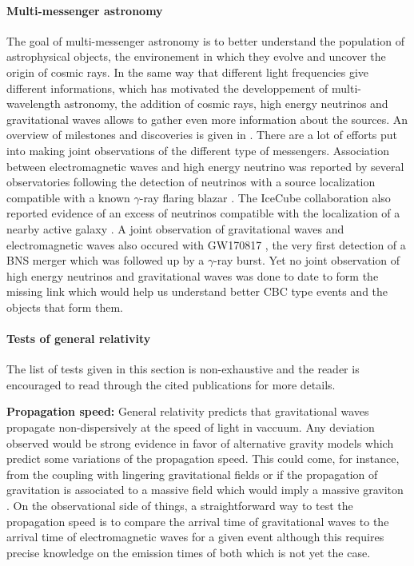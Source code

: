 \paragraph*{Multi-messenger astronomy}
\label{sec:multimessenger}
The goal of multi-messenger astronomy is to better understand the population of astrophysical objects, the environement in which they evolve and uncover the origin of cosmic rays.
In the same way that different light frequencies give different informations, which has motivated the developpement of multi-wavelength astronomy, the addition of cosmic rays, high energy neutrinos and gravitational waves allows to gather even more information about the sources.
An overview of milestones and discoveries is given in \cite{multimessenger}.
There are a lot of efforts put into making joint observations of the different type of messengers.
Association between electromagnetic waves and high energy neutrino was reported by several observatories following the detection of neutrinos with a source localization compatible with a known $\gamma$-ray flaring blazar \cite{blazar_neutrino}.
The IceCube collaboration also reported evidence of an excess of neutrinos compatible with the localization of a nearby active galaxy \cite{agn_neutrino}.
A joint observation of gravitational waves and electromagnetic waves also occured with GW170817 \cite{gw170817}, the very first detection of a BNS merger which was followed up by a $\gamma$-ray burst.
Yet no joint observation of high energy neutrinos and gravitational waves was done to date \cite{hen_gw_antares,hen_gw_icecube} to form the missing link which would help us understand better CBC type events and the objects that form them.


\paragraph*{Tests of general relativity}
\label{sec:testingGR}
The list of tests given in this section is non-exhaustive and the reader is encouraged to read through the cited publications for more details.

\vspace{0.2cm}
\textbf{Propagation speed:} General relativity predicts that gravitational waves propagate non-dispersively at the speed of light in vaccuum.
Any deviation observed would be strong evidence in favor of alternative gravity models which predict some variations of the propagation speed.
This could come, for instance, from the coupling with lingering gravitational fields or if the propagation of gravitation is associated to a massive field which would imply a massive graviton \cite{Will_1998,Will_2014,testingGR}.
On the observational side of things, a straightforward way to test the propagation speed is to compare the arrival time of gravitational waves to the arrival time of electromagnetic waves for a given event although this requires precise knowledge on the emission times of both which is not yet the case.

